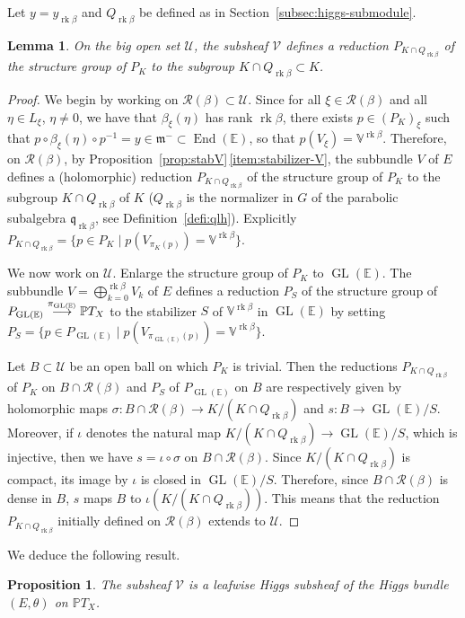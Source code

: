 \documentclass[JEP,XML,SOM,Unicode,NoFloatCountersInSection]{cedram}
\let\mathcal\mathscr
\newcommand{\To}[1]{\mathchoice{\xrightarrow{\textstyle\kern4pt#1\kern3pt}}{\stackrel{#1}{\longrightarrow}}{}{}}
\theoremstyle{plain}
\newtheorem{lemm}[theo]{Lemma}
\newtheorem{prop}[theo]{Proposition}
\theoremstyle{definition}
\DeclareMathOperator{\End}{End}
\DeclareMathOperator{\GL}{GL}
\DeclareMathOperator{\rk}{rk}
\newcommand{\cR}{\mathcal{R}}
\newcommand{\cU}{\mathcal{U}}
\newcommand{\cV}{\mathcal{V}}
\newcommand{\bE}{\mathbb{E}}
\newcommand{\PTX}{{\mathbb{P}T_X}}
\newcommand{\Vb}{\mathbb{V}^{\rgb}}
\newcommand{\fm}{\mathfrak{m}}
\newcommand{\fq}{\mathfrak{q}}
\newcommand{\rgb}{{\rk\beta}}
\begin{document}
Let $y=y_\rgb$ and $Q_{\rgb}$ be defined as in Section~\ref{subsec:higgs-submodule}.

\begin{lemm}\label{lemm:reduction}
On the big open set $\cU$, the subsheaf $\cV$ defines a reduction $P_{K\cap Q_\rgb}$ of the
structure group of $P_K$ to the subgroup $K\cap Q_\rgb\subset K$.
\end{lemm}

\begin{proof}
We begin by working on $\cR(\beta)\subset\cU$.
Since for
all $\xi\in\cR(\beta)$ and all \hbox{$\eta\in L_\xi$}, $\eta\neq 0$, we have that $\beta_\xi(\eta)$ has rank
$\rgb$, there exists $p\in (P_K)_\xi$ such that \hbox{$p\circ\beta_\xi(\eta)\circ p^{-1}=y\in\fm^-\subset\End
(\bE)$}, so
that $p (V_\xi)=\Vb$. Therefore, on
$\cR(\beta)$, by Proposition~\ref{prop:stabV}\,\eqref{item:stabilizer-V},
the subbundle $V$ of $ E$ defines a (holomorphic) reduction $P_{K\cap Q_\rgb}$ of the
structure group of $P_K$ to the subgroup $K\cap Q_\rgb$ of $K$ ($Q_\rgb$ is the normalizer in $G$ of the
parabolic subalgebra $\fq_\rgb$, see Definition~\ref{defi:qlh}). Explicitly $P_{K\cap Q_\rgb}=\{p\in P_K\mid
p(V_{\pi_K(p)})=\Vb \}$.

We now work on $\cU$. Enlarge the structure group of $P_K$ to $\GL(\bE)$. The subbundle
$V=\bigoplus_{k=0}^\rgb V_k$ of $ E$ defines a reduction $P_S$ of the structure group of $P_{\GL(\bE)} \To{\pi_{\GL(\bE)}}\PTX$ to the
stabilizer $S$ of $\Vb$ in $\GL(\bE)$ by setting \hbox{$P_S\!=\!\{p\!\in\!P_{\GL(\bE)}\mid p (V_{\pi_{\GL(\bE)}(p)})\!=\!\Vb\}$}.

Let $B\subset\cU$ be an open ball on which $P_K$ is trivial. Then the reductions $P_{K\cap Q_\rgb}$ of
$P_K$ on $B\cap\cR(\beta)$
and $P_S$ of $P_{\GL(\bE)}$ on $B$ are respectively given by holomorphic maps $\sigma:B\cap\cR(\beta)\to
K/(K\cap Q_\rgb)$ and $s:B\to \GL(\bE)/S$. Moreover, if $\iota$ denotes the natural map $K/(K\cap Q_\rgb)\to
\GL(\bE)/S$, which is injective, then we have $s=\iota\circ\sigma$ on $B\cap\cR(\beta)$. Since
$K/(K\cap Q_\rgb)$ is compact, its image by $\iota$ is closed in $\GL(\bE)/S$. Therefore, since $B\cap\cR(\beta)$ is dense in $B$, $s$ maps $B$ to $\iota(K/(K\cap Q_\rgb))$. This means that the reduction
$P_{K\cap Q_\rgb}$ initially defined on $\cR(\beta)$ extends to $\cU$.
\end{proof}

We deduce the following result.

\begin{prop}\label{prop:VHiggs}
The subsheaf $\cV$ is a leafwise Higgs subsheaf of the Higgs bundle $(E,\theta)$ on $\PTX$.
\end{prop}
\end{document}
